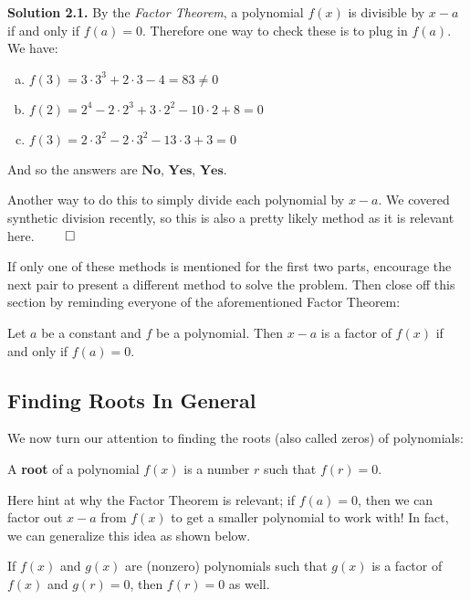 \textbf{Solution 2.1.} By the \emph{Factor Theorem}, a polynomial $f(x)$ is divisible by $x-a$ if and only if $f(a) = 0$. Therefore one way to check these is to plug in $f(a)$. We have:
\begin{enumerate}[(a)]
    \item $f(3) = 3\cdot 3^3 + 2\cdot 3 - 4 = 83 \neq 0$
    \item $f(2) = 2^4 - 2\cdot 2^3 + 3\cdot 2^2 - 10\cdot 2 + 8 = 0$
    \item $f(3) = 2\cdot 3^2 - 2\cdot 3^2 - 13\cdot 3 + 3 = 0$
\end{enumerate} And so the answers are $\boxed{\textbf{No, Yes, Yes}}$.

Another way to do this to simply divide each polynomial by $x-a$. We covered synthetic division recently, so this is also a pretty likely method as it is relevant here. \hspace*{\fill} $\qed$

If only one of these methods is mentioned for the first two parts, encourage the next pair to present a different method to solve the problem. Then close off this section by reminding everyone of the aforementioned Factor Theorem:

\begin{theorem}
    Let $a$ be a constant and $f$ be a polynomial. Then $x-a$ is a factor of $f(x)$ if and only if $f(a) = 0$.
\end{theorem}



\subsection{Finding Roots In General}

We now turn our attention to finding the roots (also called zeros) of polynomials:

\begin{definition}
    A \textbf{root} of a polynomial $f(x)$ is a number $r$ such that $f(r) = 0$.
\end{definition}

Here hint at why the Factor Theorem is relevant; if $f(a) = 0$, then we can factor out $x-a$ from $f(x)$ to get a smaller polynomial to work with! In fact, we can generalize this idea as shown below. 

\begin{proposition}
    If $f(x)$ and $g(x)$ are (nonzero) polynomials such that $g(x)$ is a factor of $f(x)$ and $g(r) = 0$, then $f(r) = 0$ as well.
\end{proposition}

